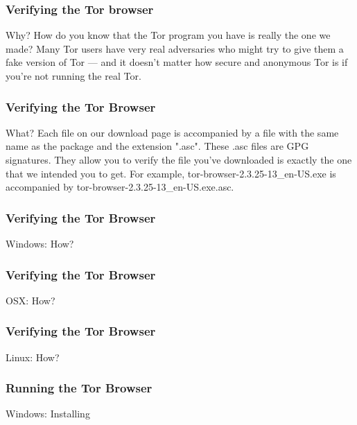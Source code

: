 \documentclass{beamer}
\begin{document}
\begin{frame}
\frametitle{Verifying the Tor browser}
        \begin{block}{Why?}
How do you know that the Tor program you have is really the one we made? Many Tor users have very real adversaries who might try to give them a fake version of Tor — and it doesn't matter how secure and anonymous Tor is if you're not running the real Tor.
	\end{block}
\end{frame}

\begin{frame}
\frametitle{Verifying the Tor Browser}
        \begin{block}{What?}
Each file on our download page is accompanied by a file with the same name as the package and the extension ".asc". These .asc files are GPG signatures. They allow you to verify the file you've downloaded is exactly the one that we intended you to get. For example, tor-browser-2.3.25-13\_en-US.exe is accompanied by tor-browser-2.3.25-13\_en-US.exe.asc.
        \end{block}
\end{frame}

\begin{frame}
\frametitle{Verifying the Tor Browser}
        \begin{block}{Windows: How?}
		\center
	\end{block}
\end{frame}

\begin{frame}
\frametitle{Verifying the Tor Browser}
	\begin{block}{OSX: How?}
        \center
	\end{block}
\end{frame}

\begin{frame}
\frametitle{Verifying the Tor Browser}
        \begin{block}{Linux: How?}
		\center
	\end{block}
\end{frame}

\begin{frame}
\frametitle{Running the Tor Browser}
        \begin{block}{Windows: Installing}
	\center	
	\end{block}
\end{frame}
\end{document}
